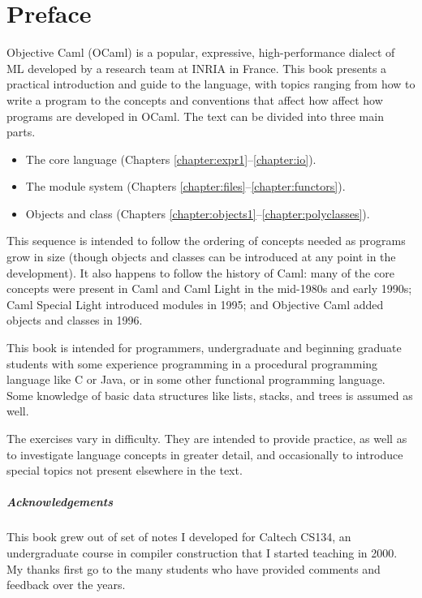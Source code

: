 %
%
%
\chapter{Preface}

Objective Caml (OCaml) is a popular, expressive, high-performance dialect of ML developed
by a research team at INRIA in France.  This book presents a practical introduction and
guide to the language, with topics ranging from how to write a program to the concepts and
conventions that affect how affect how programs are developed in OCaml.  The text can be divided into
three main parts.

\begin{itemize}
\item The core language (Chapters \ref{chapter:expr1}--\ref{chapter:io}).
\item The module system (Chapters \ref{chapter:files}--\ref{chapter:functors}).
\item Objects and class (Chapters \ref{chapter:objects1}--\ref{chapter:polyclasses}).
\end{itemize}
%
This sequence is intended to follow the ordering of concepts needed as programs
grow in size (though objects and classes can be introduced at any point in the development).  It
also happens to follow the history of Caml: many of the core concepts were present in Caml and Caml
Light in the mid-1980s and early 1990s; Caml Special Light introduced modules in 1995; and Objective
Caml added objects and classes in 1996.

This book is intended for programmers, undergraduate and beginning graduate students
with some experience programming in a procedural programming language like C or Java, or
in some other functional programming language.  Some knowledge of basic data structures like lists,
stacks, and trees is assumed as well.

The exercises vary in difficulty.  They are intended to provide practice, as well as to investigate
language concepts in greater detail, and occasionally to introduce special topics not present
elsewhere in the text.

\paragraph{Acknowledgements}
This book grew out of set of notes I developed for Caltech CS134, an undergraduate course in
compiler construction that I started teaching in 2000.  My thanks first go to the many students who
have provided comments and feedback over the years.

